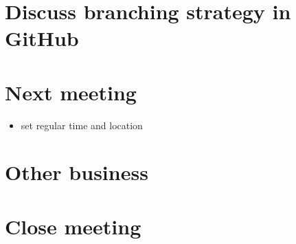 \documentclass[11pt, a4paper]{article}
\begin{document}
\section{Discuss branching strategy in GitHub}

\section{Next meeting}
\begin{itemize}
\item set regular time and location
\end{itemize}

\section{Other business}

\section {Close meeting}
\vspace*{10pt}
\end{document}
